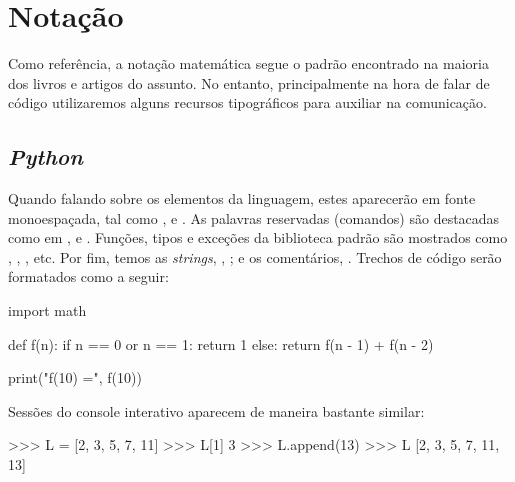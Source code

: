 \chapter*{Notação}%
	Como referência, a notação matemática segue o padrão encontrado na maioria dos livros e artigos do assunto. No entanto, principalmente na hora de falar de código utilizaremos alguns recursos tipográficos para auxiliar na comunicação. \par

	\section*{\textit{Python}}%
	Quando falando sobre os elementos da linguagem, estes aparecerão em fonte monoespaçada, tal como ,  e .
	As palavras reservadas (comandos) são destacadas como em ,  e . Funções, tipos e exceções da biblioteca padrão são mostrados como , , , etc. Por fim, temos as \textit{strings}, , ; e os comentários, . Trechos de código serão formatados como a seguir:
	\begin{lstpython}
	import math

	def f(n):
		if n == 0 or n == 1:
			return 1
		else:
			return f(n - 1) + f(n - 2)

	print("f(10) =", f(10))
	\end{lstpython}
	Sessões do console interativo aparecem de maneira bastante similar:
	\begin{lstpython}
	>>> L = [2, 3, 5, 7, 11]
	>>> L[1]
	3
	>>> L.append(13)
	>>> L
	[2, 3, 5, 7, 11, 13]
	\end{lstpython}
